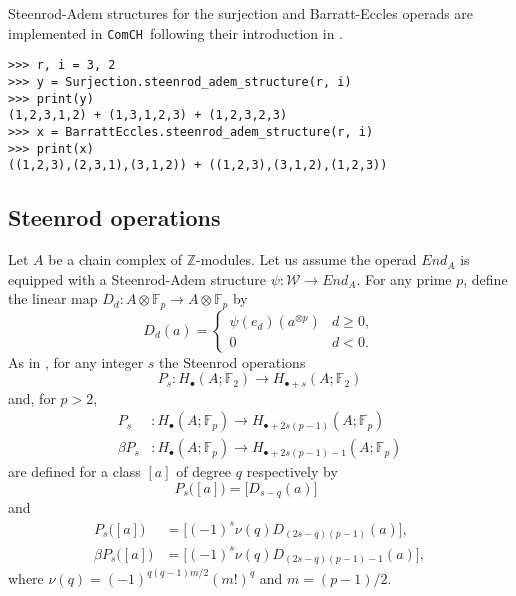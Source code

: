 \documentclass{amsart}
\newcommand{\comch}{\texttt{ComCH}}
\begin{document}
Steenrod-Adem structures for the surjection and Barratt-Eccles operads are implemented in \comch\, following their introduction in \cite{medina2020chain}.

\begin{Verbatim}[frame=single]
>>> r, i = 3, 2
>>> y = Surjection.steenrod_adem_structure(r, i)
>>> print(y)
(1,2,3,1,2) + (1,3,1,2,3) + (1,2,3,2,3)
>>> x = BarrattEccles.steenrod_adem_structure(r, i)
>>> print(x)
((1,2,3),(2,3,1),(3,1,2)) + ((1,2,3),(3,1,2),(1,2,3))
\end{Verbatim}

\subsection{Steenrod operations}

Let $A$ be a chain complex of $\mathbb Z$-modules. Let us assume the operad $End_A$ is equipped with a Steenrod-Adem structure $\psi \colon \mathcal W \to End_A$. For any prime $p$, define the linear map $D_d \colon A \otimes \mathbb F_p \to A \otimes \mathbb F_p$ by
\begin{equation*}
D_d(a) = \begin{cases}
\psi(e_d)(a^{\otimes p}) & d \geq 0, \\
0 & d < 0.
\end{cases}
\end{equation*}
As in \cite{May70algebraic}, for any integer $s$ the Steenrod operations
\begin{equation*}
P_s : H_\bullet(A; \mathbb F_2) \to H_{\bullet + s}(A; \mathbb F_2)
\end{equation*}
and, for $p > 2$,
\begin{align*}
P_s & \colon H_\bullet(A; \mathbb F_p) \to H_{\bullet + 2s(p-1)}(A; \mathbb F_p) \\
\beta P_s & \colon H_\bullet(A; \mathbb F_p) \to H_{\bullet + 2s(p-1) - 1}(A; \mathbb F_p)
\end{align*}
are defined for a class $[a]$ of degree $q$ respectively by
\begin{equation*}
P_s\big([a]\big) = \big[D_{s-q}(a)\big] \qquad
\end{equation*}
and
\begin{align*}
P_s\big([a]\big) & = \big[(-1)^s \nu(q) D_{(2s-q)(p-1)}(a)\big], \\
\beta P_s\big([a]\big) & = \big[(-1)^s \nu(q)D_{(2s-q)(p-1)-1}(a)\big],
\end{align*}
where $\nu(q) = (-1)^{q(q-1)m/2}(m!)^q$ and $m = (p-1)/2$.
\end{document}
